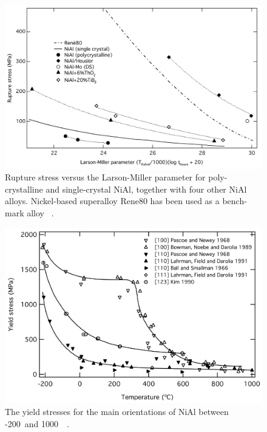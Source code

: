 %
\begin{figure}[H]
\begin{center}
\includegraphics[width=15cm]{NiAlLM}
\caption{Rupture stress versus the Larson-Miller parameter for poly-crystalline and single-crystal NiAl, together with four other NiAl alloys.  Nickel-based superalloy Rene80 has been used as a bench-mark alloy ~\cite{walston93}.}
\label{fig:NiAlLM}
\end{center}
\end{figure}
%
%
\begin{figure}[H]
\begin{center}
\includegraphics[width=15cm]{NiAlys}
\caption{The yield stresses for the main orientations of NiAl between -200\celsius\ and 1000\celsius\ ~\cite{noebe96}.}
\label{fig:NiAlys}
\end{center}
\end{figure}
%
%
